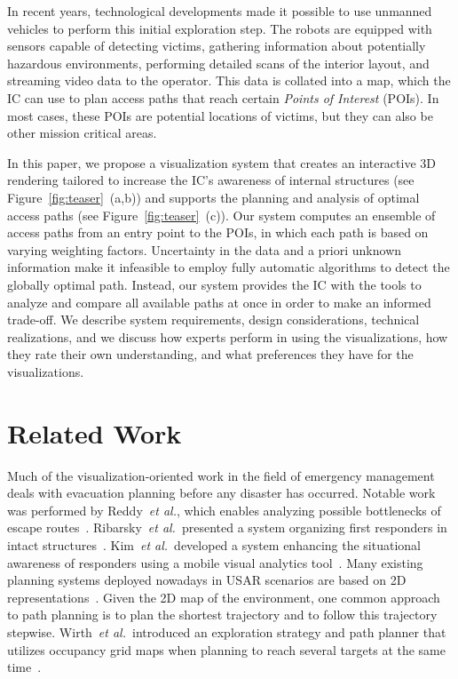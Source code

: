 \documentclass{egpubl}
\def\etal{\textit{et al.}}
\begin{document}
In recent years, technological developments made it possible to use unmanned vehicles to perform this initial exploration step. The robots are equipped with sensors capable of detecting victims, gathering information about potentially hazardous environments, performing detailed scans of the interior layout, and streaming video data to the operator. This data is collated into a map, which the IC can use to plan access paths that reach certain \emph{Points of Interest} (POIs). In most cases, these POIs are potential locations of victims, but they can also be other mission critical areas.

In this paper, we propose a visualization system that creates an interactive 3D rendering tailored to increase the IC's awareness of internal structures (see Figure~\ref{fig:teaser}~(a,b)) and supports the planning and analysis of optimal access paths (see Figure~\ref{fig:teaser}~(c)). Our system computes an ensemble of access paths from an entry point to the POIs, in which each path is based on varying weighting factors. Uncertainty in the data and a priori unknown information make it infeasible to employ fully automatic algorithms to detect the globally optimal path. Instead, our system provides the IC with the tools to analyze and compare all available paths at once in order to make an informed trade-off. We describe system requirements, design considerations, technical realizations, and we discuss how experts perform in using the visualizations, how they rate their own understanding, and what preferences they have for the visualizations.


\section{Related Work} \label{sec:relatedwork}
 Much of the visualization-oriented work in the field of emergency management deals with evacuation planning before any disaster has occurred. Notable work was performed by Reddy~\etal, which enables analyzing possible bottlenecks of escape routes~\cite{EuroVA12:13-17:2012}. Ribarsky~\etal\ presented a system organizing first responders in intact structures~\cite{Ribarsky:2010}. Kim~\etal\ developed a system enhancing the situational awareness of responders using a mobile visual analytics tool~\cite{Kim:2008}. Many existing planning systems deployed nowadays in USAR scenarios are based on 2D representations~\cite{kleiner_et_al_ssrr09,KohlbrecherMeyerStrykKlingaufFlexibleSlamSystem2011}. Given the 2D map of the environment, one common approach to path planning is to plan the shortest trajectory and to follow this trajectory stepwise. Wirth~\etal\ introduced an exploration strategy and path planner that utilizes occupancy grid maps when planning to reach several targets at the same time~\cite{Wirth2007ETA1}.
\end{document}
